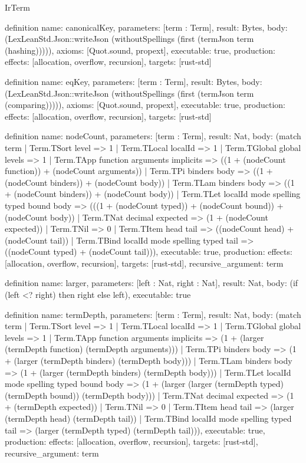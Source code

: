 \begin{lexlean}{IrTerm}
\begin{semanticmodule}
definition{
  name: canonicalKey,
  parameters: [term : Term],
  result: Bytes,
  body: (LexLeanStd.Json::writeJson (withoutSpellings (first (termJson term (hashing))))),
  axioms: [Quot.sound, propext],
  executable: true,
  production: {effects: [allocation, overflow, recursion], targets: [rust-std]}
}

definition{
  name: eqKey,
  parameters: [term : Term],
  result: Bytes,
  body: (LexLeanStd.Json::writeJson (withoutSpellings (first (termJson term (comparing))))),
  axioms: [Quot.sound, propext],
  executable: true,
  production: {effects: [allocation, overflow, recursion], targets: [rust-std]}
}

definition{
  name: nodeCount,
  parameters: [term : Term],
  result: Nat,
  body: (match term
    | Term.TSort level => 1
    | Term.TLocal localId => 1
    | Term.TGlobal global levels => 1
    | Term.TApp function arguments implicits => ((1 + (nodeCount function)) + (nodeCount arguments))
    | Term.TPi binders body => ((1 + (nodeCount binders)) + (nodeCount body))
    | Term.TLam binders body => ((1 + (nodeCount binders)) + (nodeCount body))
    | Term.TLet localId mode spelling typed bound body => (((1 + (nodeCount typed)) + (nodeCount bound)) + (nodeCount body))
    | Term.TNat decimal expected => (1 + (nodeCount expected))
    | Term.TNil => 0
    | Term.TItem head tail => ((nodeCount head) + (nodeCount tail))
    | Term.TBind localId mode spelling typed tail => ((nodeCount typed) + (nodeCount tail))),
  executable: true,
  production: {effects: [allocation, overflow, recursion], targets: [rust-std]},
  recursive_argument: term
}

definition{
  name: larger,
  parameters: [left : Nat, right : Nat],
  result: Nat,
  body: (if (left <? right) then right else left),
  executable: true
}

definition{
  name: termDepth,
  parameters: [term : Term],
  result: Nat,
  body: (match term
    | Term.TSort level => 1
    | Term.TLocal localId => 1
    | Term.TGlobal global levels => 1
    | Term.TApp function arguments implicits => (1 + (larger (termDepth function) (termDepth arguments)))
    | Term.TPi binders body => (1 + (larger (termDepth binders) (termDepth body)))
    | Term.TLam binders body => (1 + (larger (termDepth binders) (termDepth body)))
    | Term.TLet localId mode spelling typed bound body => (1 + (larger (larger (termDepth typed) (termDepth bound)) (termDepth body)))
    | Term.TNat decimal expected => (1 + (termDepth expected))
    | Term.TNil => 0
    | Term.TItem head tail => (larger (termDepth head) (termDepth tail))
    | Term.TBind localId mode spelling typed tail => (larger (termDepth typed) (termDepth tail))),
  executable: true,
  production: {effects: [allocation, overflow, recursion], targets: [rust-std]},
  recursive_argument: term
}
\end{semanticmodule}
\end{lexlean}
